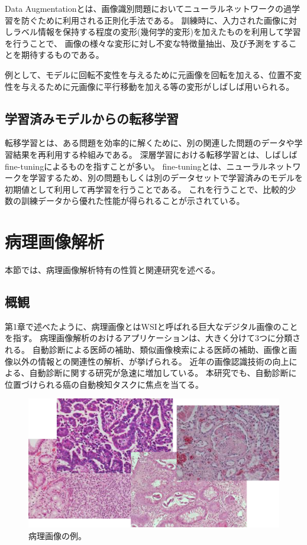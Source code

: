 Data Augmentationとは、画像識別問題においてニューラルネットワークの過学習を防ぐために利用される正則化手法である。
訓練時に、入力された画像に対しラベル情報を保持する程度の変形(幾何学的変形)を加えたものを利用して学習を行うことで、
画像の様々な変形に対し不変な特徴量抽出、及び予測をすることを期待するものである。

例として、モデルに回転不変性を与えるために元画像を回転を加える、位置不変性を与えるために元画像に平行移動を加える等の変形がしばしば用いられる。

\subsection{学習済みモデルからの転移学習}
\label{sec:transfer}
転移学習とは、ある問題を効率的に解くために、別の関連した問題のデータや学習結果を再利用する枠組みである。
深層学習における転移学習とは、しばしばfine-tuningによるものを指すことが多い。
fine-tuningとは、ニューラルネットワークを学習するため、別の問題もしくは別のデータセットで学習済みのモデルを初期値として利用して再学習を行うことである。
これを行うことで、比較的少数の訓練データから優れた性能が得られることが示されている。

\section{病理画像解析}
本節では、病理画像解析特有の性質と関連研究を述べる。

\subsection{概観}
第1章で述べたように、病理画像とはWSIと呼ばれる巨大なデジタル画像のことを指す。
病理画像解析のおけるアプリケーションは、大きく分けて3つに分類される\cite{komuraishikawa}。
自動診断による医師の補助、類似画像検索による医師の補助、画像と画像以外の情報との関連性の解析、が挙げられる。
近年の画像認識技術の向上による、自動診断に関する研究が急速に増加している。
本研究でも、自動診断に位置づけられる癌の自動検知タスクに焦点を当てる。

\begin{figure}[tbp]
    \label{fig:path_images}
     \begin{center}
      \includegraphics[width=13cm]{figures/path_images.png}
     \end{center}
    \caption{病理画像の例。}
\end{figure}
    
